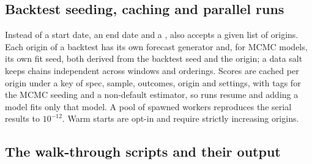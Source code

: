 \begin{table}[!htbp]
\centering\small
\caption{Environment and regeneration record: the release validation record and the walk-through
listings (commit, machine, versions of Python, NumPy, SciPy, , , pandas,
xarray and ), the BLAS backend, the benchmark machines, the release, and the
command that regenerates each table and figure.}
\label{tab:TabG2}

\end{table}

\subsection{Backtest seeding, caching and parallel runs}\label{app:backtest}

Instead of a start date, an end date and a ,  also accepts a given list
of origins.
Each origin of a backtest has its own forecast generator and, for MCMC models, its own fit seed,
both derived from the backtest seed and the origin; a data salt keeps chains independent across
windows and orderings.
Scores are cached per origin under a key of spec, sample, outcomes, origin and settings, with
tags for the MCMC seeding and a non-default estimator, so runs resume and adding a model fits only
that model.
A pool of spawned workers reproduces the serial results to $10^{-12}$.
Warm starts are opt-in and require strictly increasing origins.

\subsection{The walk-through scripts and their output}\label{app:walk-output}

